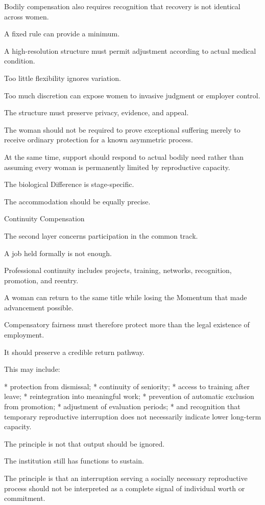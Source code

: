 Bodily compensation also requires recognition that recovery is not identical across women.

A fixed rule can provide a minimum.

A high-resolution structure must permit adjustment according to actual medical condition.

Too little flexibility ignores variation.

Too much discretion can expose women to invasive judgment or employer control.

The structure must preserve privacy, evidence, and appeal.

The woman should not be required to prove exceptional suffering merely to receive ordinary protection for a known asymmetric process.

At the same time, support should respond to actual bodily need rather than assuming every woman is permanently limited by reproductive capacity.

The biological Difference is stage-specific.

The accommodation should be equally precise.

Continuity Compensation

The second layer concerns participation in the common track.

A job held formally is not enough.

Professional continuity includes projects, training, networks, recognition, promotion, and reentry.

A woman can return to the same title while losing the Momentum that made advancement possible.

Compensatory fairness must therefore protect more than the legal existence of employment.

It should preserve a credible return pathway.

This may include:

* protection from dismissal;
* continuity of seniority;
* access to training after leave;
* reintegration into meaningful work;
* prevention of automatic exclusion from promotion;
* adjustment of evaluation periods;
* and recognition that temporary reproductive interruption does not necessarily indicate lower long-term capacity.

The principle is not that output should be ignored.

The institution still has functions to sustain.

The principle is that an interruption serving a socially necessary reproductive process should not be interpreted as a complete signal of individual worth or commitment.


